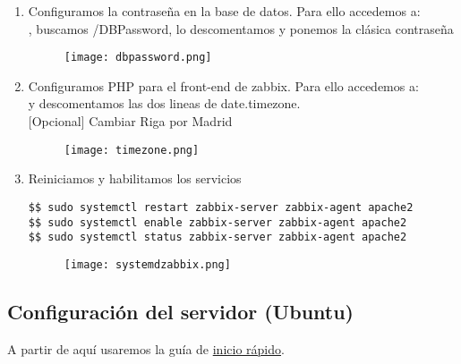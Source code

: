 \begin{enumerate}
	\item Configuramos la contraseña en la base de datos. Para ello accedemos a: \\ , buscamos /DBPassword, lo descomentamos y ponemos la clásica contraseña 
\begin{figure}[H]
	\centering
	\texttt{[image: dbpassword.png]} 
\end{figure}

\item Configuramos PHP para el front-end de zabbix. Para ello accedemos a: \\
 y descomentamos las dos lineas de date.timezone. \\
$[$Opcional$]$ Cambiar Riga por Madrid

\begin{figure}[H]
	\centering
	\texttt{[image: timezone.png]} 
\end{figure}

	\item Reiniciamos y habilitamos los servicios
	\begin{verbatim}
$$ sudo systemctl restart zabbix-server zabbix-agent apache2
$$ sudo systemctl enable zabbix-server zabbix-agent apache2
$$ sudo systemctl status zabbix-server zabbix-agent apache2
	\end{verbatim}

\begin{figure}[H]
	\centering
	\texttt{[image: systemdzabbix.png]} 
\end{figure}

\end{enumerate}



\subsection{Configuración del servidor (Ubuntu)}

A partir de aquí usaremos la guía de \href{https://www.zabbix.com/documentation/5.0/en/manual/quickstart/login}{inicio rápido}.

